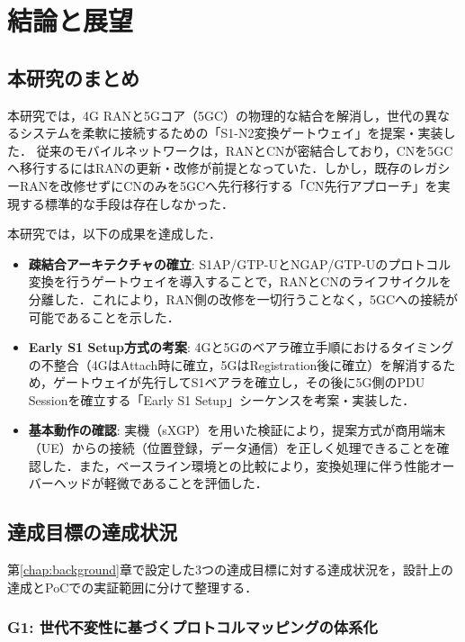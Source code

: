 \chapter{結論と展望}
\label{chap:conclusion}

\section{本研究のまとめ}
\label{sec:summary}
本研究では，4G RANと5Gコア（5GC）の物理的な結合を解消し，世代の異なるシステムを柔軟に接続するための「S1-N2変換ゲートウェイ」を提案・実装した．
従来のモバイルネットワークは，RANとCNが密結合しており，CNを5GCへ移行するにはRANの更新・改修が前提となっていた．しかし，既存のレガシーRANを改修せずにCNのみを5GCへ先行移行する「CN先行アプローチ」を実現する標準的な手段は存在しなかった．

本研究では，以下の成果を達成した．

\begin{itemize}
	\item \textbf{疎結合アーキテクチャの確立}:
	S1AP/GTP-UとNGAP/GTP-Uのプロトコル変換を行うゲートウェイを導入することで，RANとCNのライフサイクルを分離した．これにより，RAN側の改修を一切行うことなく，5GCへの接続が可能であることを示した．

	\item \textbf{Early S1 Setup方式の考案}:
	4Gと5Gのベアラ確立手順におけるタイミングの不整合（4GはAttach時に確立，5GはRegistration後に確立）を解消するため，ゲートウェイが先行してS1ベアラを確立し，その後に5G側のPDU Sessionを確立する「Early S1 Setup」シーケンスを考案・実装した．

	\item \textbf{基本動作の確認}:
	実機（sXGP）を用いた検証により，提案方式が商用端末（UE）からの接続（位置登録，データ通信）を正しく処理できることを確認した．また，ベースライン環境との比較により，変換処理に伴う性能オーバーヘッドが軽微であることを評価した．
\end{itemize}

\section{達成目標の達成状況}
第\ref{chap:background}章で設定した3つの達成目標に対する達成状況を，設計上の達成とPoCでの実証範囲に分けて整理する．

\subsection{G1: 世代不変性に基づくプロトコルマッピングの体系化}
\label{subsec:g1}
